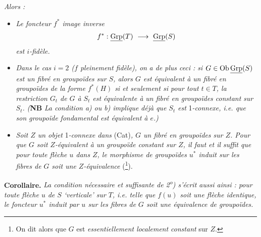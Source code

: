\textit{Alors :}

\begin{itemize}[leftmargin=3em]
\item[\textit{1\textsuperscript{o})}] \textit{Le foncteur $f^*$ image inverse}
\[
f^* : \uGrp(T) \ \fl\ \uGrp(S)
\]
\textit{est $i$-fidèle.}
\item[\textit{2\textsuperscript{o})}] \textit{Dans le cas $i = 2$ ($f$ pleinement fidèle), on}
\textit{a de plus ceci : si $G \in \mathrm{Ob}\,\underline{\mathrm{Grp}}(S)$ est un fibré en groupoïdes sur $S$, alors $G$ est équivalent à un fibré en groupoïdes de la forme $f^*(H)$ si et seulement si pour tout $t \in T$, la restriction $G_t$ de $G$ à $S_t$ est équivalente à un fibré en groupoïdes constant sur $S_t$. (}\textbf{NB} \textit{La condition a) ou b) implique déjà que $S_t$ est} 1\textit{-connexe, i.e. que son groupoïde fondamental est équivalent à $e$.)}
\item[\textit{3\textsuperscript{o})}] \textit{Soit $Z$ un objet} 1\textit{-connexe dans} (Cat)\textit{, $G$ un fibré en groupoïdes sur $Z$. Pour que $G$ soit $Z$-équivalent à un groupoïde constant sur $Z$, il faut et il suffit que pour toute flèche $u$ dans $Z$, le morphisme de groupoïdes $u^*$ induit sur les fibres de $G$ soit une $Z$-équivalence} (\footnote[3]{On dit alors que $G$ est \textit{essentiellement localement constant} sur $Z$.}).
\end{itemize}

\textbf{Corollaire.} \textit{La condition nécessaire et suffisante de 2\textsuperscript{o}) s'écrit aussi ainsi : pour toute flèche $u$ de $S$ ‘verticale’ sur $T$, i.e. telle que $f(u)$ soit une flèche identique, le foncteur $u^*$ induit par $u$ sur les fibres de $G$ soit une équivalence de groupoïdes.}

